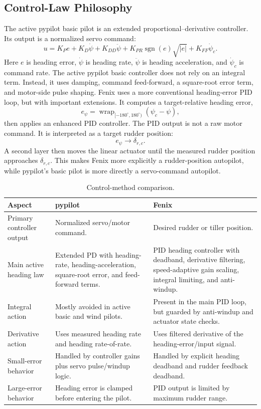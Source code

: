 \documentclass[11pt,twocolumn]{article}
\newcommand{\abs}[1]{\left\lvert #1 \right\rvert}
\begin{document}
\subsection{Control-Law Philosophy}
The active pypilot basic pilot is an extended proportional--derivative
controller.  Its output is a normalized servo command:
\[
u
=
K_P e
+
K_D \dot{\psi}
+
K_{DD}\ddot{\psi}
+
K_{PR}\operatorname{sgn}(e)\sqrt{\abs{e}}
+
K_{FF}\dot{\psi}_c .
\]
Here \(e\) is heading error, \(\dot{\psi}\) is heading rate,
\(\ddot{\psi}\) is heading acceleration, and \(\dot{\psi}_c\) is command
rate.  The active pypilot basic controller does not rely on an integral
term.  Instead, it uses damping, command feed-forward, a square-root error
term, and motor-side pulse shaping.
Fenix uses a more conventional heading-error PID loop, but with important
extensions.  It computes a target-relative heading error,
\[
e_\psi
=
\operatorname{wrap}_{[-180^\circ,180^\circ)}
\left(
\psi_c-\psi
\right),
\]
then applies an enhanced PID controller.  The PID output is not a raw
motor command.  It is interpreted as a target rudder position:
\[
e_\psi
\longrightarrow
\delta_{r,c}.
\]
A second layer then moves the linear actuator until the measured rudder
position approaches \(\delta_{r,c}\).  This makes Fenix more explicitly a
rudder-position autopilot, while pypilot's basic pilot is more directly a
servo-command autopilot.
\begin{table}[t]
\centering
\caption{Control-method comparison.}
\label{tab:pypilot-fenix-control}
\begin{tabularx}{\textwidth}{Z{0.18\textwidth}YY}
\toprule
Aspect & pypilot & Fenix \\
\midrule
Primary controller output &
Normalized servo/motor command. &
Desired rudder or tiller position. \\
Main active heading law &
Extended PD with heading-rate, heading-acceleration, square-root error,
and feed-forward terms. &
PID heading controller with deadband, derivative filtering, speed-adaptive
gain scaling, integral limiting, and anti-windup. \\
Integral action &
Mostly avoided in active basic and wind pilots. &
Present in the main PID loop, but guarded by anti-windup and actuator
state checks. \\
Derivative action &
Uses measured heading rate and heading rate-of-rate. &
Uses filtered derivative of the heading-error/input signal. \\
Small-error behavior &
Handled by controller gains plus servo pulse/windup logic. &
Handled by explicit heading deadband and rudder feedback deadband. \\
Large-error behavior &
Heading error is clamped before entering the pilot. &
PID output is limited by maximum rudder range. \\
\bottomrule
\end{tabularx}
\end{table}
\end{document}
